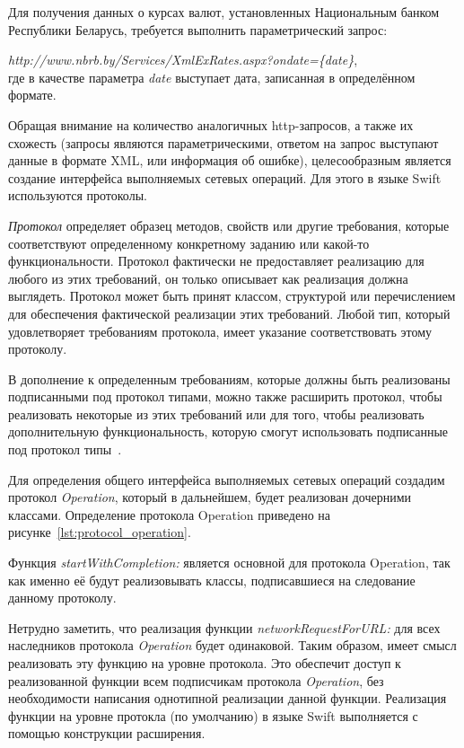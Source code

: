 Для получения данных о курсах валют, установленных Национальным банком Республики
Беларусь, требуется выполнить параметрический запрос:

\textit{http://www.nbrb.by/Services/XmlExRates.aspx?ondate=\{date\}}, \\
где в качестве параметра \textit{date} выступает дата, записанная в определённом
формате.

Обращая внимание на количество аналогичных http-запросов, а также их схожесть
(запросы являются параметрическими, ответом на запрос выступают данные в формате XML,
или информация об ошибке), целесообразным является создание интерфейса выполняемых
сетевых операций. Для этого в языке Swift используются протоколы.

\textit{Протокол} определяет образец методов, свойств или другие требования,
которые соответствуют определенному конкретному заданию или какой-то функциональности.
Протокол фактически не предоставляет реализацию для любого из этих требований,
он только описывает как реализация должна выглядеть. Протокол может быть принят классом,
структурой или перечислением для обеспечения фактической реализации этих требований.
Любой тип, который удовлетворяет требованиям протокола,
имеет указание соответствовать этому протоколу.

В дополнение к определенным требованиям, которые должны быть реализованы
подписанными под протокол типами, можно также расширить протокол, чтобы реализовать
некоторые из этих требований или для того, чтобы реализовать дополнительную
функциональность, которую смогут использовать подписанные под протокол
типы~\cite{swiftbook_protocols}.

Для определения общего интерфейса выполняемых сетевых операций создадим
протокол \textit{Operation}, который в дальнейшем, будет реализован дочерними классами.
Определение протокола Operation приведено на рисунке~\ref{lst:protocol_operation}.


Функция \textit{startWithCompletion:} является основной для протокола Operation,
так как именно её будут реализовывать классы, подписавшиеся на следование
данному протоколу.

Нетрудно заметить, что реализация функции \textit{networkRequestForURL:} для всех
наследников протокола \textit{Operation} будет одинаковой. Таким образом, имеет смысл
реализовать эту функцию на уровне протокола. Это обеспечит
доступ к реализованной функции всем подписчикам протокола \textit{Operation},
без необходимости написания однотипной реализации данной функции.
Реализация функции на уровне протокла (по умолчанию) в языке Swift выполняется с помощью
конструкции расширения.

